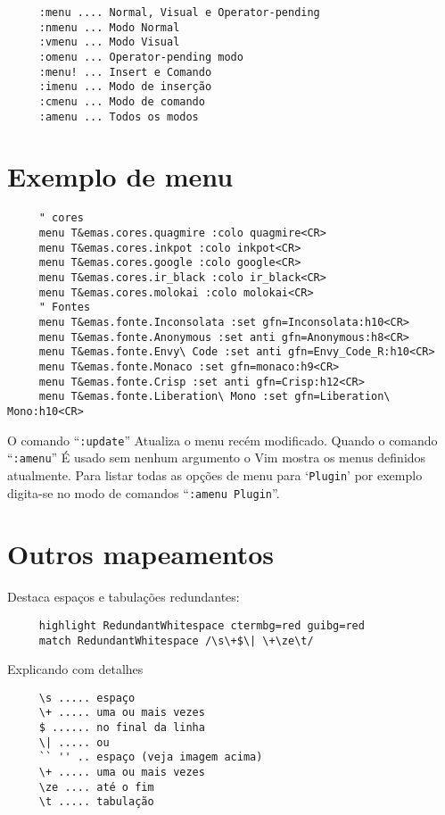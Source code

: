 \begin{verbatim}
     :menu .... Normal, Visual e Operator-pending
     :nmenu ... Modo Normal
     :vmenu ... Modo Visual
     :omenu ... Operator-pending modo
     :menu! ... Insert e Comando
     :imenu ... Modo de inserção
     :cmenu ... Modo de comando
     :amenu ... Todos os modos
\end{verbatim}

\section{Exemplo de menu}
\label{Exemplo de menu}

\begin{verbatim}
     " cores
     menu T&emas.cores.quagmire :colo quagmire<CR>
     menu T&emas.cores.inkpot :colo inkpot<CR>
     menu T&emas.cores.google :colo google<CR>
     menu T&emas.cores.ir_black :colo ir_black<CR>
     menu T&emas.cores.molokai :colo molokai<CR>
     " Fontes
     menu T&emas.fonte.Inconsolata :set gfn=Inconsolata:h10<CR>
     menu T&emas.fonte.Anonymous :set anti gfn=Anonymous:h8<CR>
     menu T&emas.fonte.Envy\ Code :set anti gfn=Envy_Code_R:h10<CR>
     menu T&emas.fonte.Monaco :set gfn=monaco:h9<CR>
     menu T&emas.fonte.Crisp :set anti gfn=Crisp:h12<CR>
     menu T&emas.fonte.Liberation\ Mono :set gfn=Liberation\ Mono:h10<CR>
\end{verbatim}

{\Large {}} O comando ``{\tt :update}'' Atualiza o menu recém modificado.  Quando o comando
``{\tt :amenu}'' É usado sem nenhum argumento o Vim mostra os menus definidos
atualmente.  Para listar todas as opções de menu para `\texttt{Plugin}' por exemplo
digita-se no modo de comandos ``{\tt :amenu Plugin}''.

\section{Outros mapeamentos}
\label{Outros mapeamentos}

Destaca espaços e tabulações redundantes:

\begin{verbatim}
     highlight RedundantWhitespace ctermbg=red guibg=red
     match RedundantWhitespace /\s\+$\| \+\ze\t/
\end{verbatim}

Explicando com detalhes

\begin{verbatim}
     \s ..... espaço
     \+ ..... uma ou mais vezes
     $ ...... no final da linha
     \| ..... ou
     `` '' .. espaço (veja imagem acima)
     \+ ..... uma ou mais vezes
     \ze .... até o fim
     \t ..... tabulação
\end{verbatim}

